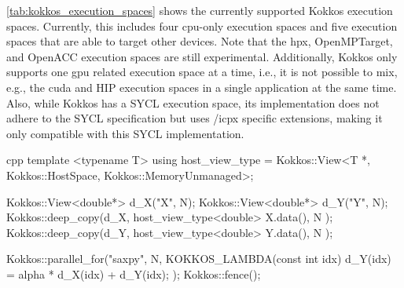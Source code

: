 \autoref{tab:kokkos_execution_spaces} shows the currently supported Kokkos execution spaces. 
Currently, this includes four \gls{cpu}-only execution spaces and five execution spaces that are able to target other devices. 
Note that the \gls{hpx}, OpenMPTarget, and OpenACC execution spaces are still experimental. 
Additionally, Kokkos only supports one \gls{gpu} related execution space at a time, i.e., it is not possible to mix, e.g., the \gls{cuda} and HIP execution spaces in a single application at the same time. 
Also, while Kokkos has a SYCL execution space, its implementation does not adhere to the SYCL specification but uses \dpcpp/icpx specific extensions, making it only compatible with this SYCL implementation. 

\begin{listing}
    \begin{moderncode}{cpp}
template <typename T>
using host_view_type = Kokkos::View<T *, Kokkos::HostSpace, Kokkos::MemoryUnmanaged>;

Kokkos::View<double*> d_X("X", N);
Kokkos::View<double*> d_Y("Y", N);
Kokkos::deep_copy(d_X, host_view_type<double>{ X.data(), N });
Kokkos::deep_copy(d_Y, host_view_type<double>{ Y.data(), N });

Kokkos::parallel_for("saxpy", N, KOKKOS_LAMBDA(const int idx) {
    d_Y(idx) = alpha * d_X(idx) + d_Y(idx);
});
Kokkos::fence();


\end{moderncode}
\end{listing}

